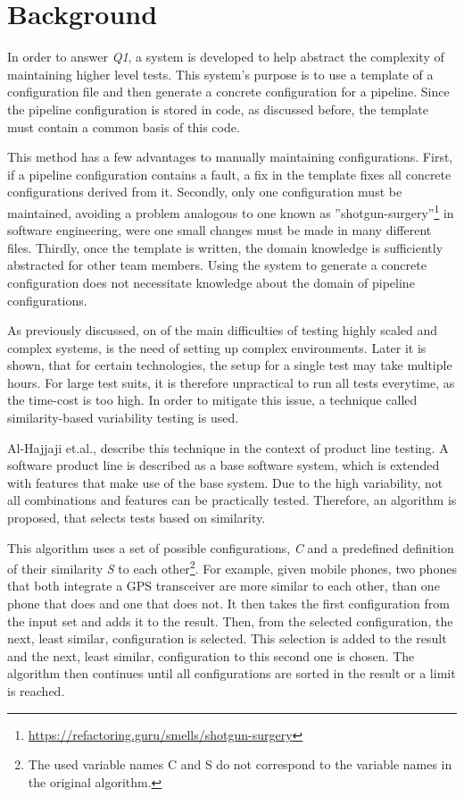 
\chapter{Background}\label{ch:background}

In order to answer \textit{Q1}, a system is developed to help abstract the complexity of maintaining higher level tests.
This system's purpose is to use a template of a configuration file and then generate a concrete configuration for a pipeline.
Since the pipeline configuration is stored in code, as discussed before, the template must contain a common basis of this code.

This method has a few advantages to manually maintaining configurations.
First, if a pipeline configuration contains a fault, a fix in the template fixes all concrete configurations derived from it.
Secondly, only one configuration must be maintained, avoiding a problem analogous to one known as ''shotgun-surgery''\footnote{\url{https://refactoring.guru/smells/shotgun-surgery}} in software engineering, were one small changes must be made in many different files.
Thirdly, once the template is written, the domain knowledge is sufficiently abstracted for other team members.
Using the system to generate a concrete configuration does not necessitate knowledge about the domain of pipeline configurations.

As previously discussed, on of the main difficulties of testing highly scaled and complex systems, is the need of setting up complex environments.
Later it is shown, that for certain technologies, the setup for a single test may take multiple hours.
For large test suits, it is therefore unpractical to run all tests everytime, as the time-cost is too high.
In order to mitigate this issue, a technique called similarity-based variability testing is used.

Al-Hajjaji et.al., describe this technique in the context of product line testing\cite{SimilarityBasedPrioritizationInSoftwareProductLineTesting}.
A software product line is described as a base software system, which is extended with features that make use of the base system.
Due to the high variability, not all combinations and features can be practically tested.
Therefore, an algorithm is proposed, that selects tests based on similarity.

This algorithm uses a set of possible configurations, \textit{C} and a predefined definition of their similarity \textit{S} to each other\footnote{The used variable names C and S do not correspond to the variable names in the original algorithm.}.
For example, given mobile phones, two phones that both integrate a GPS transceiver are more similar to each other, than one phone that does and one that does not.
It then takes the first configuration from the input set and adds it to the result.
Then, from the selected configuration, the next, least similar, configuration is selected.
This selection is added to the result and the next, least similar, configuration to this second one is chosen.
The algorithm then continues until all configurations are sorted in the result or a limit is reached.

